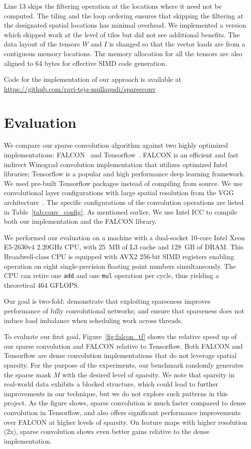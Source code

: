 \documentclass{article}
\begin{document}
Line 13 skips the filtering operation at the locations where it need not be
computed. The tiling and the loop ordering ensures that skipping the filtering
at the designated spatial locations has minimal overhead. We implemented a
version which skipped work at the level of tiles but did not see additional
benefits. The data layout of the tensors $W$ and $I$ is changed so that the
vector loads are from a contiguous memory locations. The memory allocation for
all the tensors are also aligned to 64 bytes for effective SIMD code generation.

Code for the implementation of our approach is available at
\href{https://github.com/ravi-teja-mullapudi/sparseconv}{https://github.com/ravi-teja-mullapudi/sparseconv}

\section{Evaluation}
\label{sec:eval}
We compare our sparse convolution algorithm against two highly optimized
implementations: FALCON~\cite{falcon} and Tensorflow~\cite{tensorflow}.  FALCON
is an efficient and fast indirect Winograd convolution implementation that
utilizes optimized Intel libraries; Tensorflow is a popular and high performance
deep learning framework. We used pre-built Tensorflow packages instead of
compiling from source. We use convolutional layer configurations with large
spatial resolution from the VGG architecture~\cite{simonyan2014very}.  The
specific configurations of the convolution operations are listed in
Table~\ref{tab:conv_config}. As mentioned earlier, We use Intel ICC to 
compile both our implementation and the FALCON library. 

We performed our evaluation on a machine with a dual-socket 10-core Intel 
Xeon E5-2630v4 2.20GHz CPU, with 25~MB of L3 cache and 128~GB of DRAM. This 
Broadwell-class CPU is equipped with AVX2 256-bit SIMD registers enabling
operation on eight single-precision floating point numbers simultaneously. 
The CPU can retire one \texttt{add} and one \texttt{mul} operation per cycle,
thus yielding a theoretical 464 GFLOPS.

Our goal is two-fold: demonstrate that exploiting sparseness improves performance
of fully convolutional networks; and ensure that sparseness does not induce load
imbalance when scheduling work across threads.

To evaluate our first goal, Figure~\ref{fig:falcon_tf} shows the relative speed 
up of our sparse convolution and FALCON relative to Tensorflow. Both FALCON and Tensorflow are dense
convolution implementations that do not leverage spatial sparsity. For the
purpose of the experiments, our benchmark randomly generates the sparse mask $M$
with the desired level of sparsity. We note that sparsity in real-world data 
exhibits a blocked structure, which could lead to further improvements in our
technique, but we do not explore such patterns in this project. As the figure 
shows, sparse convolution is much faster compared to dense convolution in 
Tensorflow, and also offers significant performance improvements over FALCON
at higher levels of sparsity. On feature maps with higher resolution (2x), 
sparse convolution shows even better gains relative to the dense implementation.
\end{document}
